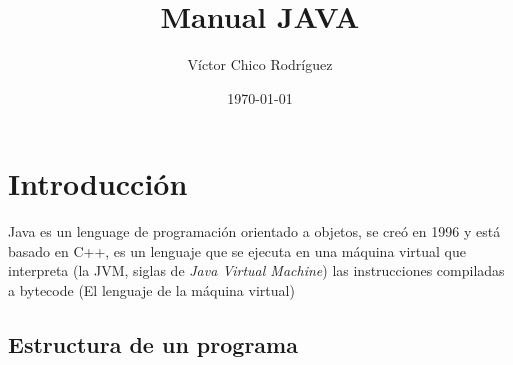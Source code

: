 \documentclass[11pt]{article}
\author{Víctor Chico Rodríguez}
\date{\today}
\title{Manual JAVA}
\begin{document}
\maketitle
\tableofcontents

\section{Introducción}
\label{sec:orgafbdf17}
Java es un lenguage de programación orientado a objetos, se creó en 1996 y está basado en C++, es un lenguaje que se ejecuta en una máquina virtual que interpreta (la JVM, siglas de \emph{Java Virtual Machine}) las instrucciones compiladas a bytecode (El lenguaje de la máquina virtual)
\subsection{Estructura de un programa}
\label{sec:org18b9140}
\end{document}
